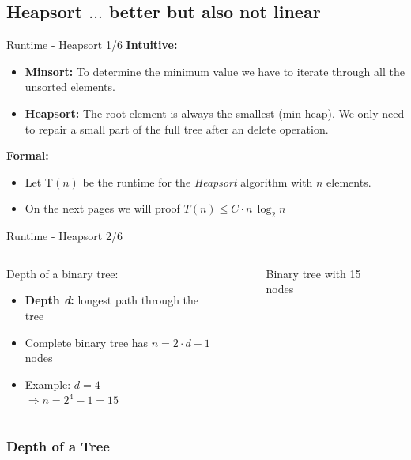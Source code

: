 \documentclass{beamer}
\begin{document}
\subsection{Heapsort $\ldots$ better but also not linear }

\begin{frame}{Runtime - Heapsort 1/6}
  \textbf{Intuitive:}
  \begin{itemize}
    \item
      \textbf{Minsort:}
      To determine the minimum value we have to iterate through all the
      unsorted elements.
    \item
      \textbf{Heapsort:}
      The root-element is always the smallest (min-heap).
      We only need to repair a small part of the full tree after an delete
      operation.
  \end{itemize}
  \textbf{Formal:}
  \begin{itemize}
    \item 
      Let T$(n)$ be the runtime for the \textit{Heapsort}
      algorithm with $n$ elements.
    \item
      On the next pages we will proof $T(n) \leq C \cdot n \, \log_2 n$
  \end{itemize}
\end{frame}


\begin{frame}{Runtime - Heapsort 2/6}
  \begin{columns}
    \begin{column}{0.5\textwidth}
      Depth of a binary tree:
      \begin{itemize}
        \item
          \textbf{Depth \textit{d}:}
          longest path through the tree
        \item
          Complete binary tree has $n = 2 \cdot d - 1$ nodes
        \item
          Example: $d = 4$\\
          $\Rightarrow n = 2^4 - 1 = 15$
      \end{itemize}
    \end{column}
    \begin{column}{0.5\textwidth}
      \begin{figure}
        \begin{centering}%
          \caption{Binary tree with 15 nodes}%
          \label{fig:binary_tree}%
        \end{centering}%
      \end{figure}
    \end{column}
  \end{columns}
\end{frame}\subsubsection{Depth of a Tree}
\end{document}
